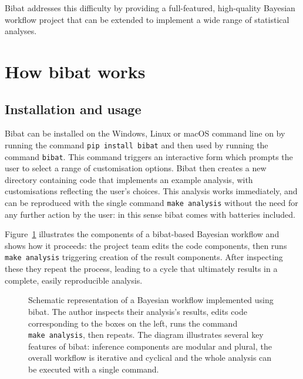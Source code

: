 \documentclass[
  letterpaper,
  DIV=11,
  numbers=noendperiod]{scrartcl}
\begin{document}
Bibat addresses this difficulty by providing a full-featured,
high-quality Bayesian workflow project that can be extended to implement
a wide range of statistical analyses.

\section{How bibat works}\label{how-bibat-works}

\subsection{Installation and usage}\label{installation-and-usage}

Bibat can be installed on the Windows, Linux or macOS command line on by
running the command \texttt{pip\ install\ bibat} and then used by
running the command \texttt{bibat}. This command triggers an interactive
form which prompts the user to select a range of customisation options.
Bibat then creates a new directory containing code that implements an
example analysis, with customisations reflecting the user's choices.
This analysis works immediately, and can be reproduced with the single
command \texttt{make\ analysis} without the need for any further action
by the user: in this sense bibat comes with batteries included.

Figure~\ref{fig-workflow} illustrates the components of a bibat-based
Bayesian workflow and shows how it proceeds: the project team edits the
code components, then runs \texttt{make\ analysis} triggering creation
of the result components. After inspecting these they repeat the
process, leading to a cycle that ultimately results in a complete,
easily reproducible analysis.

\begin{figure}


\caption{\label{fig-workflow}Schematic representation of a Bayesian
workflow implemented using bibat. The author inspects their analysis's
results, edits code corresponding to the boxes on the left, runs the
command \texttt{make\ analysis}, then repeats. The diagram illustrates
several key features of bibat: inference components are modular and
plural, the overall workflow is iterative and cyclical and the whole
analysis can be executed with a single command.}

\end{figure}%
\end{document}
